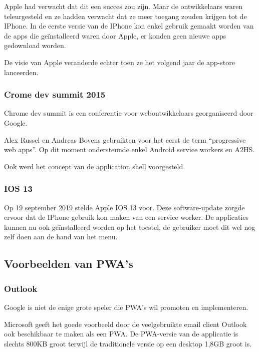 \autocite{Jobs2007}

Apple had verwacht dat dit een succes zou zijn. Maar de ontwikkelaars waren teleurgesteld en ze hadden verwacht dat ze meer toegang zouden krijgen tot de IPhone. In de eerste versie van de IPhone kon enkel gebruik gemaakt worden van de apps die geïnstalleerd waren door Apple, er konden geen nieuwe apps gedownload worden.
\autocite{Strieb2016}

 De visie van Apple veranderde echter toen ze het volgend jaar de app-store lanceerden. \autocite{Silver2018}
 
 \subsubsection{Crome dev summit 2015}
 
 Chrome dev summit is een conferentie voor webontwikkelaars georganiseerd door Google. 
 
 Alex Russel en Andreas Bovens gebruikten voor het eerst de term “progressive web apps”. Op dit moment ondersteunde enkel Android service workers en A2HS.
 
 Ook werd het concept van de application shell voorgesteld.
 \autocite{Russel2015}
 
 
 \subsubsection{IOS 13}
 Op 19 september 2019 stelde Apple IOS 13 voor. Deze software-update zorgde ervoor dat de IPhone gebruik kon maken van een service worker. De applicaties kunnen nu ook geïnstalleerd worden op het toestel, de gebruiker moet dit wel nog zelf doen aan de hand van het menu.
 \autocite{Apple2020}
 


\subsection{Voorbeelden van PWA's}

\subsubsection{Outlook}
Google is niet de enige grote speler die PWA’s wil promoten en implementeren.
\autocite{Microsoft2020}

Microsoft geeft het goede voorbeeld door de veelgebruikte email client Outlook ook beschikbaar te maken als een PWA.
De PWA-versie van de applicatie is slechts 800KB groot terwijl de traditionele versie op een desktop 1,8GB groot is.

